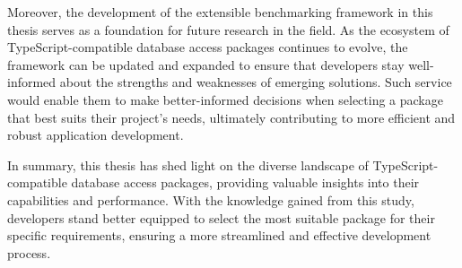 Moreover, the development of the extensible benchmarking framework in this
thesis serves as a foundation for future research in the field. As the ecosystem
of TypeScript-compatible database access packages continues to evolve, the
framework can be updated and expanded to ensure that developers stay
well-informed about the strengths and weaknesses of emerging solutions. Such
service would enable them to make better-informed decisions when selecting a
package that best suits their project's needs, ultimately contributing to more
efficient and robust application development.

In summary, this thesis has shed light on the diverse landscape of
TypeScript-compatible database access packages, providing valuable insights into
their capabilities and performance. With the knowledge gained from this study,
developers stand better equipped to select the most suitable package for their
specific requirements, ensuring a more streamlined and effective development
process.